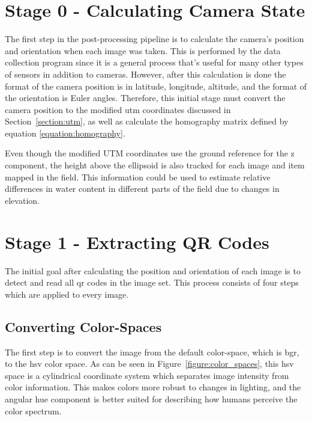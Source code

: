 \section{Stage 0 - Calculating Camera State}
\label{processing-stage0}

The first step in the post-processing pipeline is to calculate the camera's position and orientation when each image was taken.  This is performed by the data collection program since it is a general process that's useful for many other types of sensors in addition to cameras.  However, after this calculation is done the format of the camera position is in latitude, longitude, altitude, and the format of the orientation is Euler angles.  Therefore, this initial stage must convert the camera position to the modified \ac{utm} coordinates discussed in Section~\ref{section:utm}, as well as calculate the homography matrix defined by equation \ref{equation:homography}.  

Even though the modified UTM coordinates use the ground reference for the z component, the height above the ellipsoid is also tracked for each image and item mapped in the field.  This information could be used to estimate relative differences in water content in different parts of the field due to changes in elevation. 

\section{Stage 1 - Extracting QR Codes}
\label{processing-stage1}

The initial goal after calculating the position and orientation of each image is to detect and read all \ac{qr} codes in the image set.  This process consists of four steps which are applied to every image.

\subsection{Converting Color-Spaces}

The first step is to convert the image from the default color-space, which is \ac{bgr}, to the \ac{hsv} color space.  As can be seen in Figure~\ref{figure:color_spaces}, this \ac{hsv} space is a cylindrical coordinate system which separates image intensity from color information.  This makes colors more robust to changes in lighting, and the angular hue component is better suited for describing how humans perceive the color spectrum.


